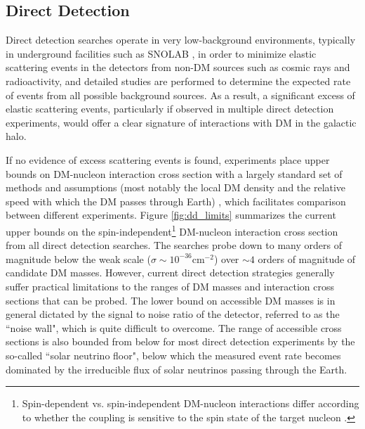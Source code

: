 \subsection{Direct Detection}

Direct detection searches operate in very low-background environments, typically in underground facilities such as SNOLAB \cite{Lawson_2020}, in order to minimize elastic scattering events in the detectors from non-DM sources such as cosmic rays and radioactivity, and detailed studies are performed to determine the expected rate of events from all possible background sources. As a result, a significant excess of elastic scattering events, particularly if observed in multiple direct detection experiments, would offer a clear signature of interactions with DM in the galactic halo. 

If no evidence of excess scattering events is found, experiments place upper bounds on DM-nucleon interaction cross section with a largely standard set of methods and assumptions (most notably the local DM density and the relative speed with which the DM passes through Earth) \cite{dd_results_standards_2021}, which facilitates comparison between different experiments. Figure \ref{fig:dd_limits} summarizes the current upper bounds on the spin-independent\footnote{Spin-dependent vs. spin-independent DM-nucleon interactions differ according to whether the coupling is sensitive to the spin state of the target nucleon \cite{billard2021direct}.} DM-nucleon interaction cross section from all direct detection searches. The searches probe down to many orders of magnitude below the weak scale (\(\sigma\sim10^{-36}\)cm\(^{-2}\)) over \(\sim4\) orders of magnitude of candidate DM masses. However, current direct detection strategies generally suffer practical limitations to the ranges of DM masses and interaction cross sections that can be probed. The lower bound on accessible DM masses is in general dictated by the signal to noise ratio of the detector, referred to as the ``noise wall", which is quite difficult to overcome. The range of accessible cross sections is also bounded from below for most direct detection experiments by the so-called ``solar neutrino floor", below which the measured event rate becomes dominated by the irreducible flux of solar neutrinos passing through the Earth. 

